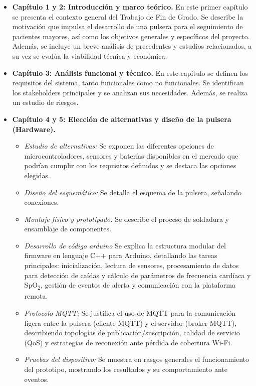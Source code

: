 \documentclass[12pt, a4paper]{article}
\begin{document}
	\begin{itemize}
		\item \textbf{Capítulo 1 y 2: Introducción y marco teórico.}  
		En este primer capítulo se presenta el contexto general del Trabajo de Fin de Grado. Se describe la motivación que impulsa el desarrollo de una pulsera para el seguimiento de pacientes mayores, así como los objetivos generales y específicos del proyecto. Además, se incluye un breve análisis de precedentes y estudios relacionados, a su vez se evalúa la viabilidad técnica y económica.
		
		\item \textbf{Capítulo 3: Análisis funcional y técnico.}  
		En este capítulo se definen los requisitos del sistema, tanto funcionales como no funcionales. Se identifican los stakeholders principales y se analizan sus necesidades. Además, se realiza un estudio de riesgos.
		
		\item \textbf{Capítulo 4 y 5: Elección de alternativas y diseño de la pulsera (Hardware).}  
		\begin{itemize}
			\item \emph{Estudio de alternativas:} Se exponen las diferentes opciones de microcontroladores, sensores y baterías disponibles en el mercado que podrían cumplir con los requisitos definidos y se destaca las opciones elegidas.
			\item \emph{Diseño del esquemático:} Se detalla el esquema de la pulsera, señalando conexiones.
			\item \emph{Montaje físico y prototipado:} Se describe el proceso de soldadura y ensamblaje de componentes.  
			\item \emph{Desarrollo de código arduino} Se explica la estructura modular del firmware en lenguaje C++ para Arduino, detallando las tareas principales: inicialización, lectura de sensores, procesamiento de datos para detección de caídas y cálculo de parámetros de frecuencia cardíaca y SpO\textsubscript{2}, gestión de eventos de alerta y comunicación con la plataforma remota.  
			\item \emph{Protocolo MQTT:} Se justifica el uso de MQTT para la comunicación ligera entre la pulsera (cliente MQTT) y el servidor (broker MQTT), describiendo topologías de publicación/suscripción, calidad de servicio (QoS) y estrategias de reconexión ante pérdida de cobertura Wi-Fi.
			\item \emph{Pruebas del dispositivo:} Se muestra en rasgos generales el funcionamiento del prototipo, mostrando los resultados y su comportamiento ante eventos.
		\end{itemize}
		

\end{itemize}
\end{document}

